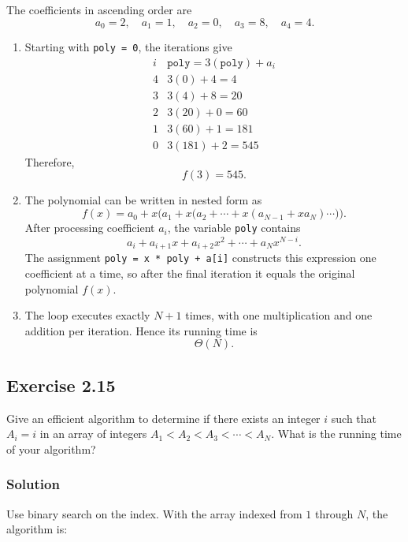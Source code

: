 \documentclass[12pt,a4paper]{article}
\begin{document}
The coefficients in ascending order are
\[
a_0=2,\quad a_1=1,\quad a_2=0,\quad a_3=8,\quad a_4=4.
\]

\begin{enumerate}
  \renewcommand{\labelenumi}{\alph{enumi}.}

  \item Starting with \texttt{poly = 0}, the iterations give
  \[
  \begin{array}{c|c}
  i & \texttt{poly}=3(\texttt{poly})+a_i \\
  \hline
  4 & 3(0)+4=4 \\
  3 & 3(4)+8=20 \\
  2 & 3(20)+0=60 \\
  1 & 3(60)+1=181 \\
  0 & 3(181)+2=545
  \end{array}
  \]
  Therefore,
  \[
  \boxed{f(3)=545}.
  \]

  \item The polynomial can be written in nested form as
  \[
  f(x)=a_0+x\bigl(a_1+x\bigl(a_2+\cdots
       +x(a_{N-1}+xa_N)\cdots\bigr)\bigr).
  \]
  After processing coefficient $a_i$, the variable \texttt{poly}
  contains
  \[
  a_i+a_{i+1}x+a_{i+2}x^2+\cdots+a_Nx^{N-i}.
  \]
  The assignment \texttt{poly = x * poly + a[i]} constructs this
  expression one coefficient at a time, so after the final iteration it
  equals the original polynomial $f(x)$.

  \item The loop executes exactly $N+1$ times, with one multiplication
  and one addition per iteration. Hence its running time is
  \[
  \boxed{\Theta(N)}.
  \]
\end{enumerate}

\subsection*{\color{sectionnavy}Exercise 2.15}

\noindent
Give an efficient algorithm to determine if there exists an integer
$i$ such that $A_i=i$ in an array of integers
$A_1<A_2<A_3<\cdots<A_N$. What is the running time of your algorithm?

\subsubsection*{\color{sectionnavy}Solution}

Use binary search on the index. With the array indexed from $1$ through
$N$, the algorithm is:
\end{document}
